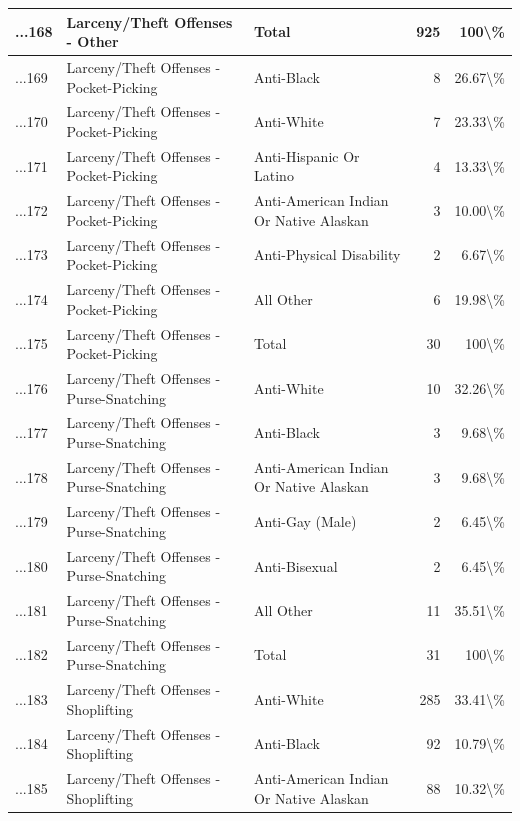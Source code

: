 \documentclass[
]{krantz}
\begin{document}
\begin{longtable}[t]{l|l|l|r|r}
\hline
...168 & Larceny/Theft Offenses - Other & Total & 925 & 100\textbackslash{}\%\\
\hline
...169 & Larceny/Theft Offenses - Pocket-Picking & Anti-Black & 8 & 26.67\textbackslash{}\%\\
\hline
...170 & Larceny/Theft Offenses - Pocket-Picking & Anti-White & 7 & 23.33\textbackslash{}\%\\
\hline
...171 & Larceny/Theft Offenses - Pocket-Picking & Anti-Hispanic Or Latino & 4 & 13.33\textbackslash{}\%\\
\hline
...172 & Larceny/Theft Offenses - Pocket-Picking & Anti-American Indian Or Native Alaskan & 3 & 10.00\textbackslash{}\%\\
\hline
...173 & Larceny/Theft Offenses - Pocket-Picking & Anti-Physical Disability & 2 & 6.67\textbackslash{}\%\\
\hline
...174 & Larceny/Theft Offenses - Pocket-Picking & All Other & 6 & 19.98\textbackslash{}\%\\
\hline
...175 & Larceny/Theft Offenses - Pocket-Picking & Total & 30 & 100\textbackslash{}\%\\
\hline
...176 & Larceny/Theft Offenses - Purse-Snatching & Anti-White & 10 & 32.26\textbackslash{}\%\\
\hline
...177 & Larceny/Theft Offenses - Purse-Snatching & Anti-Black & 3 & 9.68\textbackslash{}\%\\
\hline
...178 & Larceny/Theft Offenses - Purse-Snatching & Anti-American Indian Or Native Alaskan & 3 & 9.68\textbackslash{}\%\\
\hline
...179 & Larceny/Theft Offenses - Purse-Snatching & Anti-Gay (Male) & 2 & 6.45\textbackslash{}\%\\
\hline
...180 & Larceny/Theft Offenses - Purse-Snatching & Anti-Bisexual & 2 & 6.45\textbackslash{}\%\\
\hline
...181 & Larceny/Theft Offenses - Purse-Snatching & All Other & 11 & 35.51\textbackslash{}\%\\
\hline
...182 & Larceny/Theft Offenses - Purse-Snatching & Total & 31 & 100\textbackslash{}\%\\
\hline
...183 & Larceny/Theft Offenses - Shoplifting & Anti-White & 285 & 33.41\textbackslash{}\%\\
\hline
...184 & Larceny/Theft Offenses - Shoplifting & Anti-Black & 92 & 10.79\textbackslash{}\%\\
\hline
...185 & Larceny/Theft Offenses - Shoplifting & Anti-American Indian Or Native Alaskan & 88 & 10.32\textbackslash{}\%\\

\end{longtable}
\end{document}
